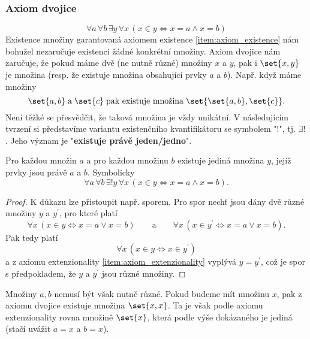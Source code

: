 \subsubsection{Axiom dvojice}
\begin{equation*}
    \forall a\,\forall b\,\exists y\,\forall x\,(x \in y \iff x=a \land x=b)
\end{equation*}
Existence množiny garantovaná axiomem existence \ref{item:axiom_existence} nám bohužel nezaručuje existenci žádné konkrétní množiny. Axiom dvojice nám zaručuje, že pokud máme dvě (ne nutně různé) množiny $x$ a $y$, pak i $\set{x,y}$ je množina (resp. že existuje množina obsahující prvky $a$ a $b$). Např. když máme množiny
\begin{equation*}
    \set{a,b}\;\text{a}\;\set{c}\;\text{pak existuje množina}\;\set{\set{a,b},\set{c}}.
\end{equation*}
Není těžké se přesvědčit, že taková množina je vždy unikátní. V následujícím tvrzení si představíme variantu existenčního kvantifikátoru se symbolem "$!$", tj. $\exists!$. Jeho význam je "\textbf{existuje právě jeden/jedno}".
\begin{lemma}\label{lem:univerzalnost_neusp_dvojic}
    Pro každou množin $a$ a pro každou množinu $b$ existuje jediná množina $y$, jejíž prvky jsou právě $a$ a $b$. Symbolicky
    \begin{equation*}
        \forall a\,\forall b\,\exists!y\,\forall x\,(x \in y \iff x=a \land x=b).
    \end{equation*}
\end{lemma}
\begin{proof}
    K důkazu lze přistoupit např. sporem. Pro spor nechť jsou dány dvě různé množiny $y$ a $y^\prime$, pro které platí
    \begin{equation*}
        \forall x\,(x\in y \iff x=a \lor x=b)\qquad \text{a}\qquad\forall x\, (x\in y^\prime \iff x=a \lor x=b).
    \end{equation*}
    Pak tedy platí
    \begin{equation*}
        \forall x\,(x\in y \iff x\in y^\prime)
    \end{equation*}
    a z axiomu extenzionality \ref{item:axiom_extenzionality} vyplývá $y=y^\prime$, což je spor s předpokladem, že $y$ a $y^\prime$ jsou různé množiny.
\end{proof}
Množiny $a,b$ nemusí být však nutně různé. Pokud budeme mít množinu $x$, pak z axiomu dvojice existuje množina $\set{x,x}$. Ta je však podle axiomu extenzionality rovna množině $\set{x}$, která podle výše dokázaného je jediná (stačí uvážit $a=x$ a $b=x$).
